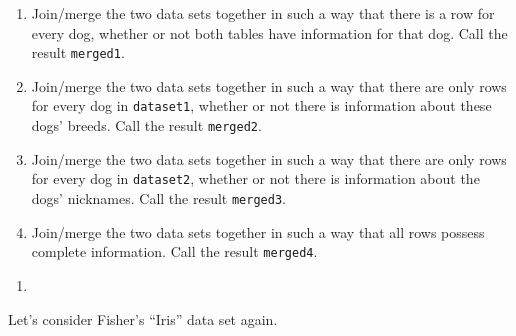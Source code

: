 \documentclass[12pt,krantz2]{krantz}
\providecommand{\tightlist}{%
  \setlength{\itemsep}{0pt}\setlength{\parskip}{0pt}}
\begin{document}
\begin{enumerate}
\def\labelenumi{\alph{enumi})}
\tightlist
\item
  Join/merge the two data sets together in such a way that there is a row for every dog, whether or not both tables have information for that dog. Call the result \texttt{merged1}.
\item
  Join/merge the two data sets together in such a way that there are only rows for every dog in \texttt{dataset1}, whether or not there is information about these dogs' breeds. Call the result \texttt{merged2}.
\item
  Join/merge the two data sets together in such a way that there are only rows for every dog in \texttt{dataset2}, whether or not there is information about the dogs' nicknames. Call the result \texttt{merged3}.
\item
  Join/merge the two data sets together in such a way that all rows possess complete information. Call the result \texttt{merged4}.
\end{enumerate}

\begin{enumerate}
\def\labelenumi{\arabic{enumi}.}
\setcounter{enumi}{3}
\item
\end{enumerate}

Let's consider Fisher's ``Iris'' data set \citep{misc_iris_53} again.
\end{document}
